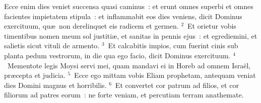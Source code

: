 \lettrine[lines=10,image=true,loversize=0.05,lraise=-0.03]{E}{}cce enim dies veniet succensa quasi caminus~: et erunt omnes superbi et omnes facientes impietatem stipula~: et inflammabit eos dies veniens, dicit Dominus exercituum, qu\ae\ non derelinquet eis radicem et germen.
${}^{2}$~Et orietur vobis timentibus nomen meum sol justiti\ae , et sanitas in pennis ejus~: et egrediemini, et salietis sicut vituli de armento.
${}^{3}$~Et calcabitis impios, cum fuerint cinis sub planta pedum vestrorum, in die qua ego facio, dicit Dominus exercituum.
${}^{4}$~Mementote legis Moysi servi mei, quam mandavi ei in Horeb ad omnem Isra\"el, pr\ae cepta et judicia.
${}^{5}$~Ecce ego mittam vobis Eliam prophetam, antequam veniat dies Domini magnus et horribilis.
${}^{6}$~Et convertet cor patrum ad filios, et cor filiorum ad patres eorum~: ne forte veniam, et percutiam terram anathemate.
